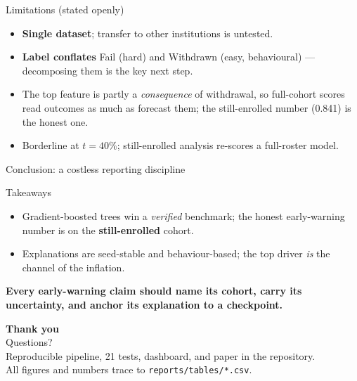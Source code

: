\documentclass[aspectratio=169,11pt]{beamer}
\begin{document}
\begin{frame}{Limitations (stated openly)}
\begin{itemize}
  \item \textbf{Single dataset}; transfer to other institutions is untested.
  \item \textbf{Label conflates} Fail (hard) and Withdrawn (easy, behavioural) --- decomposing them is the key next step.
  \item The top feature is partly a \emph{consequence} of withdrawal, so full-cohort scores read outcomes as much as forecast them; the still-enrolled number (0.841) is the honest one.
  \item Borderline at $t{=}40\%$; still-enrolled analysis re-scores a full-roster model.
\end{itemize}
\end{frame}

\begin{frame}{Conclusion: a costless reporting discipline}
\begin{block}{Takeaways}
\begin{itemize}
  \item Gradient-boosted trees win a \emph{verified} benchmark; the honest early-warning number is on the \textbf{still-enrolled} cohort.
  \item Explanations are seed-stable and behaviour-based; the top driver \emph{is} the channel of the inflation.
\end{itemize}
\end{block}
\centering\color{themecol}\textbf{Every early-warning claim should name its cohort, carry its uncertainty, and anchor its explanation to a checkpoint.}
\end{frame}

\begin{frame}{}
\vfill\centering
{\Large\color{themecol}\textbf{Thank you}}\\[0.6em]
Questions?\\[1.2em]
\footnotesize Reproducible pipeline, 21 tests, dashboard, and paper in the repository.\\
All figures and numbers trace to \texttt{reports/tables/*.csv}.
\vfill
\end{frame}
\end{document}

